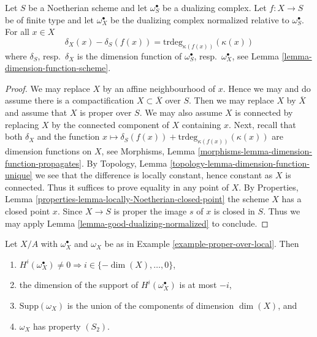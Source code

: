 \begin{lemma}
\label{lemma-good-dualizing-dimension-function}
Let $S$ be a Noetherian scheme and let $\omega_S^\bullet$ be a
dualizing complex. Let $f : X \to S$ be of finite type
and let $\omega_X^\bullet$ be the dualizing complex
normalized relative to $\omega_S^\bullet$. For all $x \in X$
$$
\delta_X(x) - \delta_S(f(x)) = \text{trdeg}_{\kappa(f(x))}(\kappa(x))
$$
where $\delta_S$, resp.\ $\delta_X$
is the dimension function of
$\omega_S^\bullet$, resp.\ $\omega_X^\bullet$, see
Lemma \ref{lemma-dimension-function-scheme}.
\end{lemma}

\begin{proof}
We may replace $X$ by an affine neighbourhood of $x$. Hence we may
and do assume there is a compactification $X \subset \overline{X}$
over $S$. Then we may replace $X$ by $\overline{X}$ and assume
that $X$ is proper over $S$. We may also assume $X$ is connected
by replacing $X$ by the connected component of $X$ containing $x$.
Next, recall that both $\delta_X$ and the function
$x \mapsto \delta_S(f(x)) + \text{trdeg}_{\kappa(f(x))}(\kappa(x))$
are dimension functions on $X$, see
Morphisms, Lemma \ref{morphisms-lemma-dimension-function-propagates}.
By Topology, Lemma \ref{topology-lemma-dimension-function-unique}
we see that the difference is locally constant, hence constant as $X$ is
connected. Thus it suffices to prove equality in any point of $X$.
By Properties, Lemma \ref{properties-lemma-locally-Noetherian-closed-point}
the scheme $X$ has a closed point $x$. Since $X \to S$ is proper
the image $s$ of $x$ is closed in $S$. Thus we may apply
Lemma \ref{lemma-good-dualizing-normalized} to conclude.
\end{proof}

\begin{lemma}
\label{lemma-vanishing-good-dualizing}
Let $X/A$ with $\omega_X^\bullet$ and $\omega_X$ be as in
Example \ref{example-proper-over-local}. Then
\begin{enumerate}
\item $H^i(\omega_X^\bullet) \not = 0 \Rightarrow
i \in \{-\dim(X), \ldots, 0\}$,
\item the dimension of the support of $H^i(\omega_X^\bullet)$ is at most $-i$,
\item $\text{Supp}(\omega_X)$ is the union of
the components of dimension $\dim(X)$, and
\item $\omega_X$ has property $(S_2)$.
\end{enumerate}
\end{lemma}

